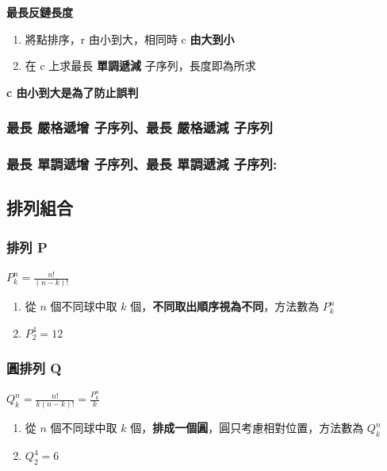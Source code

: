 \documentclass[10pt,oneside]{article}
\begin{document}
\begin{landscape}
\begin{multicols}{2}
{\normalsize
\noindent \textbf{最長反鏈長度}

\begin{enumerate}
	\item 將點排序，r 由小到大，相同時 c \textbf{由大到小}
	\item 在 c 上求最長 \textbf{單調遞減} 子序列，長度即為所求
\end{enumerate}

\noindent \textbf{c 由小到大是為了防止誤判}
}

\subsubsection{最長 嚴格遞增 子序列、最長 嚴格遞減 子序列}


\subsubsection{最長 單調遞增 子序列、最長 單調遞減 子序列:}


\columnbreak
\subsection{排列組合}

\subsubsection{排列 P}

{\normalsize 
$P^n_k = \frac{n!}{(n-k)!}$

\begin{enumerate}
	\item 從 $n$ 個不同球中取 $k$ 個，\textbf{不同取出順序視為不同}，方法數為 $P^n_k$
	\item $P^4_2 = 12$
\end{enumerate}
}

\subsubsection{圓排列 Q}

{\normalsize
$Q^n_k = \frac{n!}{k (n-k)!} = \frac{P^n_k}{k}$

\begin{enumerate}
	\item 從 $n$ 個不同球中取 $k$ 個，\textbf{排成一個圓}，圓只考慮相對位置，方法數為 $Q^n_k$
	\item $Q^4_2 = 6$
\end{enumerate}
}


\end{multicols}
\end{landscape}
\end{document}
